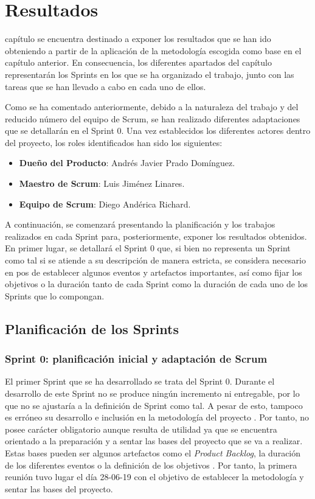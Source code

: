 \chapter{Resultados}
\label{chap:resultados}

 capítulo se encuentra destinado a exponer los resultados que se han ido obteniendo a partir de la aplicación de la metodología escogida como base en el capítulo anterior. En consecuencia, los diferentes apartados del capítulo representarán los Sprints en los que se ha organizado el trabajo, junto con las tareas que se han llevado a cabo en cada uno de ellos.

Como se ha comentado anteriormente, debido a la naturaleza del trabajo y del reducido número del equipo de Scrum, se han realizado diferentes adaptaciones que se detallarán en el Sprint 0. Una vez establecidos los diferentes actores dentro del proyecto, los roles identificados han sido los siguientes:

\begin{itemize}
    \item \textbf{Dueño del Producto}: Andrés Javier Prado Domínguez.
    \item \textbf{Maestro de Scrum}: Luis Jiménez Linares.
    \item \textbf{Equipo de Scrum}: Diego Andérica Richard.
\end{itemize}

A continuación, se comenzará presentando la planificación y los trabajos realizados en cada Sprint para, posteriormente, exponer los resultados obtenidos. En primer lugar, se detallará el Sprint 0 que, si bien no representa un Sprint como tal si se atiende a su descripción de manera estricta, se considera necesario en pos de establecer algunos eventos y artefactos importantes, así como fijar los objetivos o la duración tanto de cada Sprint como la duración de cada uno de los Sprints que lo compongan.

\clearpage

\section{Planificación de los Sprints}

\subsection{Sprint 0: planificación inicial y adaptación de Scrum}
El primer Sprint que se ha desarrollado se trata del Sprint 0. Durante el desarrollo de este Sprint no se produce ningún incremento ni entregable, por lo que no se ajustaría a la definición de Sprint como tal. A pesar de esto, tampoco es erróneo su desarrollo e inclusión en la metodología del proyecto \cite{alexballarinlatre2017}. Por tanto, no posee carácter obligatorio aunque resulta de utilidad ya que se encuentra orientado a la preparación y a sentar las bases del proyecto que se va a realizar. Estas bases pueden ser algunos artefactos como el \textit{Product Backlog}, la duración de los diferentes eventos o la definición de los objetivos \cite{agripinopetit2017}. Por tanto, la primera reunión tuvo lugar el día 28-06-19 con el objetivo de establecer la metodología y sentar las bases del proyecto.

